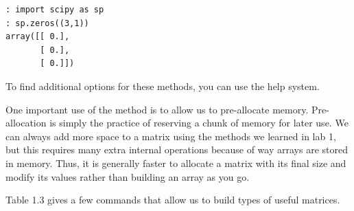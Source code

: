 \begin{lstlisting}[style=python]
: import scipy as sp
: sp.zeros((3,1))
array([[ 0.],
       [ 0.],
       [ 0.]])
\end{lstlisting}

To find additional options for these methods, you can use the help system.


One important use of the  method is to allow us to pre-allocate memory. Pre-allocation is simply the practice of reserving a chunk of memory for later use. We can always add more space to a matrix using the methods we learned in lab 1, but this requires many extra internal operations because of way arrays are stored in memory. Thus, it is generally faster to allocate a matrix with its final size and modify its values rather than building an array as you go.



Table 1.3 gives a few commands that allow us to build types of useful matrices.

